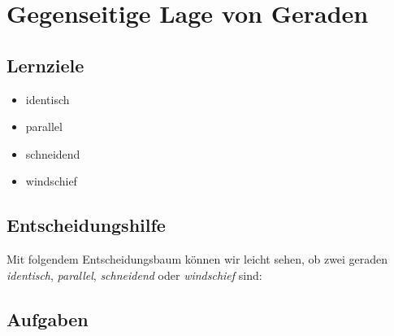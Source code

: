 \section{Gegenseitige Lage von Geraden}

\subsection*{Lernziele}
\begin{itemize}
\item identisch
\item parallel
\item schneidend
\item windschief
\end{itemize}


\subsection{Entscheidungshilfe}
Mit folgendem Entscheidungsbaum können wir leicht sehen, ob zwei
geraden \textit{identisch}, \textit{parallel}, \textit{schneidend}
oder \textit{windschief} sind:



\subsection*{Aufgaben}


